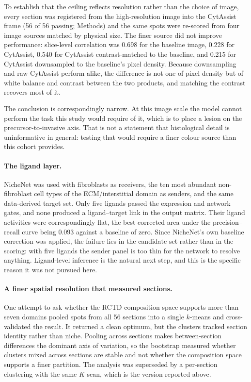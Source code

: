To establish that the ceiling reflects resolution rather than the choice of image, every
section was registered from the high-resolution image into the CytAssist frame (56 of 56
passing; Methods) and the same spots were re-scored from four image sources matched by
physical size. The finer source did not improve performance: slice-level correlation was
0.698 for the baseline image, 0.228 for CytAssist, 0.540 for CytAssist contrast-matched to
the baseline, and 0.215 for CytAssist downsampled to the baseline's pixel density. Because
downsampling and raw CytAssist perform alike, the difference is not one of pixel density but
of white balance and contrast between the two products, and matching the contrast recovers
most of it.

The conclusion is correspondingly narrow. At this image scale the model cannot perform the
task this study would require of it, which is to place a lesion on the precursor-to-invasive
axis. That is not a statement that histological detail is uninformative in general: testing
that would require a finer colour source than this cohort provides.

\paragraph{The ligand layer.} NicheNet was used with fibroblasts as receivers, the ten most
abundant non-fibroblast cell types of the ECM/interstitial domain as senders, and the same
data-derived target set. Only five ligands passed the expression and network gates, and none
produced a ligand--target link in the output matrix. Their ligand activities were
correspondingly flat, the best corrected area under the precision--recall curve being 0.093
against a baseline of zero. Since NicheNet's own baseline correction was applied, the
failure lies in the candidate set rather than in the scoring: with five ligands the sender
panel is too thin for the network to resolve anything. Ligand-level inference is the natural
next step, and this is the specific reason it was not pursued here.

\paragraph{A finer spatial resolution that measured sections.} One attempt to ask whether the
RCTD composition space supports more than seven domains pooled spots from all 56 sections
into a single $k$-means and cross-validated the result. It returned a clean optimum, but the
clusters tracked section identity rather than niche. Pooling across sections makes
between-section differences the dominant axis of variation, so the bootstrap measured
whether clusters mixed across sections are stable and not whether the composition space
supports a finer partition. The analysis was superseded by a per-section clustering with the
same $K$ scan, which is the version reported above.




